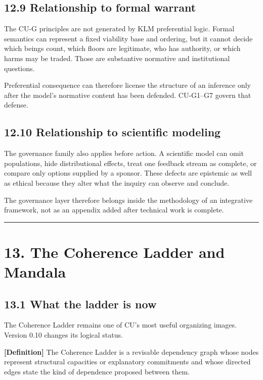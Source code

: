 \documentclass[
  11pt,
]{article}
\begin{document}
\subsection{12.9 Relationship to formal
warrant}\label{relationship-to-formal-warrant}

The CU-G principles are not generated by KLM preferential logic. Formal
semantics can represent a fixed viability base and ordering, but it
cannot decide which beings count, which floors are legitimate, who has
authority, or which harms may be traded. Those are substantive normative
and institutional questions.

Preferential consequence can therefore license the structure of an
inference only after the model's normative content has been defended.
CU-G1--G7 govern that defense.

\subsection{12.10 Relationship to scientific
modeling}\label{relationship-to-scientific-modeling}

The governance family also applies before action. A scientific model can
omit populations, hide distributional effects, treat one feedback stream
as complete, or compare only options supplied by a sponsor. These
defects are epistemic as well as ethical because they alter what the
inquiry can observe and conclude.

The governance layer therefore belongs inside the methodology of an
integrative framework, not as an appendix added after technical work is
complete.

\begin{center}\rule{0.5\linewidth}{0.5pt}\end{center}

\section{13. The Coherence Ladder and
Mandala}\label{the-coherence-ladder-and-mandala}

\subsection{13.1 What the ladder is now}\label{what-the-ladder-is-now}

The Coherence Ladder remains one of CU's most useful organizing images.
Version 0.10 changes its logical status.

\textbf{{[}Definition{]}} The Coherence Ladder is a revisable dependency
graph whose nodes represent structural capacities or explanatory
commitments and whose directed edges state the kind of dependence
proposed between them.
\end{document}

